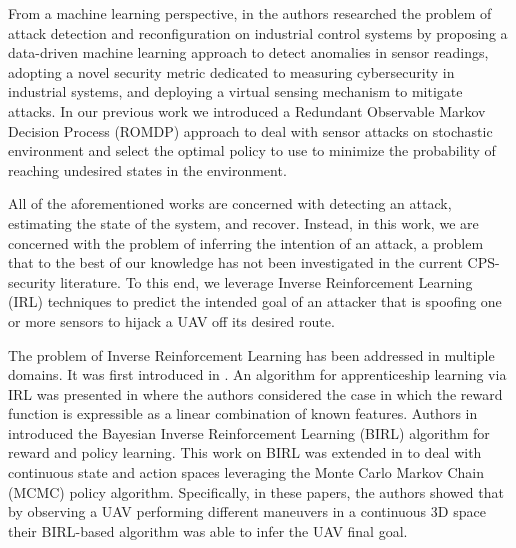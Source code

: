 \documentclass[letterpaper, 10 pt, conference]{ieeeconf}  %
\newcommand\NB[1]{$\spadesuit$\footnote{NB: #1}}
\begin{document}
From a machine learning perspective, in \cite{paridari2017framework} the authors researched the problem of attack detection and reconfiguration on industrial control systems by proposing a data-driven machine learning approach to detect anomalies in sensor readings,  adopting a novel security metric dedicated to measuring cybersecurity in industrial systems, and deploying a virtual sensing mechanism to mitigate attacks. 
In our previous work \cite{bezzo2016stochastic} we introduced a Redundant Observable Markov Decision Process (ROMDP) approach to deal with sensor attacks on stochastic environment and select the optimal policy to use to minimize the probability of reaching undesired states in the environment. 

All of the aforementioned works are concerned with detecting an attack, estimating the state of the system, and recover. Instead, in this work, we are concerned with the problem of inferring the intention of an attack, a problem that to the best of our knowledge has not been investigated in the current CPS-security literature.
To this end, we leverage Inverse Reinforcement Learning (IRL) techniques to predict the intended goal of an attacker that is spoofing one or more sensors to hijack a UAV off its desired route.
%

The problem of Inverse Reinforcement Learning has been addressed in multiple domains. It was first introduced in \cite{ng2000algorithms}. An algorithm for apprenticeship learning via IRL was presented in \cite{abbeel2004apprenticeship} where the authors considered the case in which the reward function is expressible as a linear combination of known features. 
Authors in \cite{ramachandran2007bayesian} introduced the Bayesian Inverse Reinforcement Learning (BIRL) algorithm for reward and policy learning. This work on BIRL was extended in \cite{michini2015bayesian,michini2013scalable,michini2012improving} to deal with continuous state and action spaces leveraging the Monte Carlo Markov Chain (MCMC) policy algorithm. Specifically, in these papers, the authors showed that by observing a UAV performing different maneuvers in a continuous 3D space their BIRL-based algorithm was able to infer the UAV final goal. 
\end{document}
